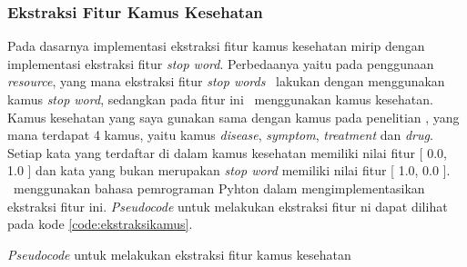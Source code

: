 \subsubsection{Ekstraksi Fitur Kamus Kesehatan}
Pada dasarnya implementasi ekstraksi fitur kamus kesehatan mirip dengan implementasi ekstraksi fitur \textit{stop word}. Perbedaanya yaitu pada penggunaan \textit{resource}, yang mana ekstraksi fitur \textit{stop words} \saya~lakukan dengan menggunakan kamus \textit{stop word}, sedangkan pada fitur ini \saya~menggunakan kamus kesehatan. Kamus kesehatan yang saya gunakan sama dengan kamus pada penelitian \cite{skripsiKakRadit}, yang mana terdapat 4 kamus, yaitu kamus \textit{disease}, \textit{symptom}, \textit{treatment} dan \textit{drug}. Setiap kata yang terdaftar di dalam kamus kesehatan memiliki nilai fitur [ 0.0, 1.0 ] dan kata yang bukan merupakan \textit{stop word} memiliki nilai fitur [ 1.0, 0.0 ]. \Saya~menggunakan bahasa pemrograman Pyhton dalam mengimplementasikan ekstraksi fitur ini. \textit{Pseudocode} untuk melakukan ekstraksi fitur ni dapat dilihat pada kode \ref{code:ekstraksikamus}.

\begin{kode}

	
	\SetAlgoLined
	\BlankLine
	
	
	\caption{\textit{Pseudocode} untuk melakukan ekstraksi fitur kamus kesehatan}
	\label{code:ekstraksikamus}	
\end{kode}


